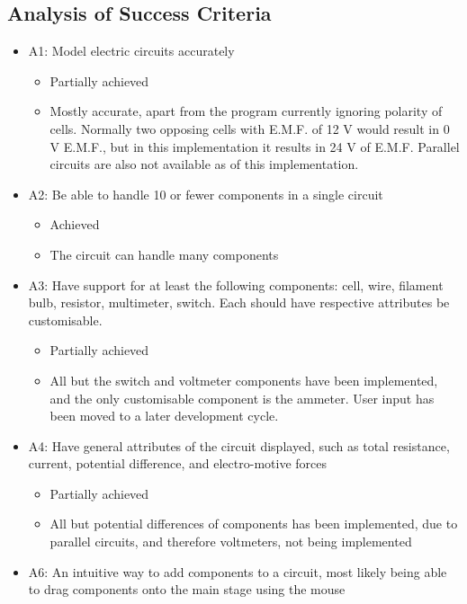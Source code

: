     \subsection{Analysis of Success Criteria}
    \begin{itemize}
        \item A1: Model electric circuits accurately
        \begin{itemize}
            \item Partially achieved
            \item Mostly accurate, apart from the program currently ignoring polarity of cells. Normally two opposing cells with E.M.F. of 12 V would result in 0 V E.M.F., but in this implementation it results in 24 V of E.M.F. Parallel circuits are also not available as of this implementation.
        \end{itemize}
        \item A2: Be able to handle 10 or fewer components in a single circuit
        \begin{itemize}
            \item Achieved
            \item The circuit can handle many components
        \end{itemize}
        \item A3: Have support for at least the following components: cell, wire, filament bulb, resistor, multimeter, switch. Each should have respective attributes be customisable.
        \begin{itemize}
            \item Partially achieved
            \item All but the switch and voltmeter components have been implemented, and the only customisable component is the ammeter. User input has been moved to a later development cycle.
        \end{itemize}
        \item A4: Have general attributes of the circuit displayed, such as total resistance, current, potential difference, and electro-motive forces
        \begin{itemize}
            \item Partially achieved
            \item All but potential differences of components has been implemented, due to parallel circuits, and therefore voltmeters, not being implemented
        \end{itemize}
        \item A6: An intuitive way to add components to a circuit, most likely being able to drag components onto the main stage using the mouse

\end{itemize}
